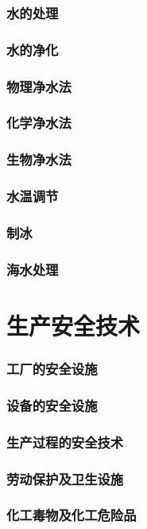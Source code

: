\documentclass[UTF8]{../../ApplicationUniverse}
\begin{document}
    \subsubsection{水的处理}
        \subsubsection{水的净化}
            \subsubsection{物理净水法}
            \subsubsection{化学净水法}
            \subsubsection{生物净水法}
        \subsubsection{水温调节}
        \subsubsection{制冰}
        \subsubsection{海水处理}
\section{生产安全技术}
    \subsubsection{工厂的安全设施}
    \subsubsection{设备的安全设施}
    \subsubsection{生产过程的安全技术}
    \subsubsection{劳动保护及卫生设施}
    \subsubsection{化工毒物及化工危险品}
\end{document}

